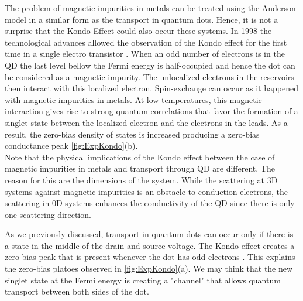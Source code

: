   The problem of magnetic impurities in metals can be treated using the Anderson model in a similar form as the transport in quantum dots. Hence, it is not a surprise that the Kondo Effect could also occur these systems. In 1998 the technological advances allowed the observation of the Kondo effect for the first time in a single electro transistor \cite{goldhaber-gordon_kondo_1998}. When an odd number of electrons is in the QD the last level bellow the Fermi energy is half-occupied and hence the dot can be considered as a magnetic impurity. The unlocalized electrons in the reservoirs then interact with this localized electron. Spin-exchange can occur as it happened with  magnetic impurities in metals. At low temperatures, this magnetic  interaction gives rise to strong quantum correlations that favor the formation of a singlet state between the localized electron and the electrons in the leads. As a result, the zero-bias density of states is increased producing a zero-bias conductance peak \ref{fig:ExpKondo}(b). \\

Note that the physical implications of the Kondo effect  between the case of magnetic impurities in metals and transport through QD are different. The reason for this are the dimensions of the system. While the scattering at 3D systems against magnetic impurities is an obstacle to conduction electrons, the scattering in 0D systems enhances the conductivity of the QD since there is only one scattering direction. 

 As we previously discussed, transport in quantum dots can occur only if there is a state in the middle of the drain and source voltage. The Kondo effect creates a zero bias peak that is present whenever the dot has odd electrons . This explains the zero-bias platoes observed in \ref{fig:ExpKondo}(a). We may think that the new singlet state at the Fermi energy is creating a "channel" that allows quantum transport between both sides of the dot.  




















